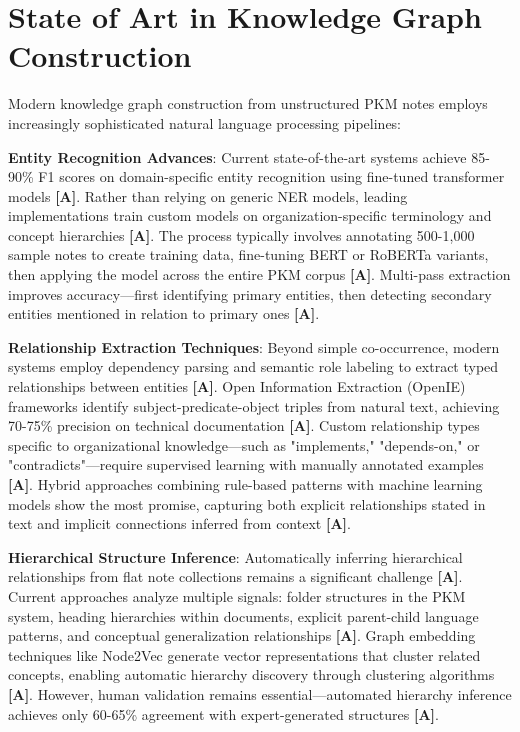\documentclass[a4paper,11pt]{article}
\newcommand{\alabel}{\textbf{\textcolor{acolor}{[A]}}}
\begin{document}
\section{State of Art in Knowledge Graph Construction}

Modern knowledge graph construction from unstructured PKM notes employs increasingly sophisticated natural language processing pipelines:


\textbf{Entity Recognition Advances}: Current state-of-the-art systems achieve 85-90\% F1 scores on domain-specific entity recognition using fine-tuned transformer models \alabel{}. Rather than relying on generic NER models, leading implementations train custom models on organization-specific terminology and concept hierarchies \alabel{}. The process typically involves annotating 500-1,000 sample notes to create training data, fine-tuning BERT or RoBERTa variants, then applying the model across the entire PKM corpus \alabel{}. Multi-pass extraction improves accuracy—first identifying primary entities, then detecting secondary entities mentioned in relation to primary ones \alabel{}.


\textbf{Relationship Extraction Techniques}: Beyond simple co-occurrence, modern systems employ dependency parsing and semantic role labeling to extract typed relationships between entities \alabel{}. Open Information Extraction (OpenIE) frameworks identify subject-predicate-object triples from natural text, achieving 70-75\% precision on technical documentation \alabel{}. Custom relationship types specific to organizational knowledge—such as "implements," "depends-on," or "contradicts"—require supervised learning with manually annotated examples \alabel{}. Hybrid approaches combining rule-based patterns with machine learning models show the most promise, capturing both explicit relationships stated in text and implicit connections inferred from context \alabel{}.


\textbf{Hierarchical Structure Inference}: Automatically inferring hierarchical relationships from flat note collections remains a significant challenge \alabel{}. Current approaches analyze multiple signals: folder structures in the PKM system, heading hierarchies within documents, explicit parent-child language patterns, and conceptual generalization relationships \alabel{}. Graph embedding techniques like Node2Vec generate vector representations that cluster related concepts, enabling automatic hierarchy discovery through clustering algorithms \alabel{}. However, human validation remains essential—automated hierarchy inference achieves only 60-65\% agreement with expert-generated structures \alabel{}.
\end{document}
